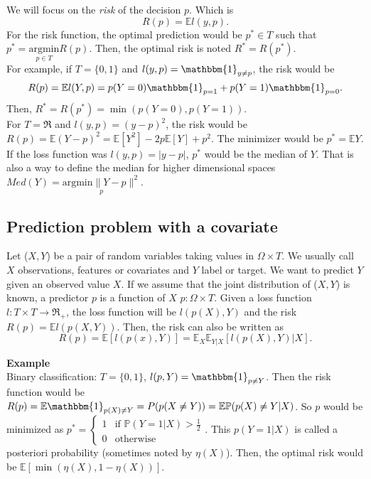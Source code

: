 \documentclass[11pt, english]{article}
\begin{document}
We will focus on the \textit{risk} of the decision $p$. Which is
\begin{equation}
	R(p)=\mathbb{E}l(y,p).
\end{equation}
For the risk function, the optimal prediction would be $p^*\in T$ such that $p^*=\underset{p\in T}{\text{argmin}}R(p)$. Then, the optimal risk is noted $R^*=R(p^*)$.\\

For example, if $ T=\{0,1\}$ and $l(y,p)=\mathbbm{1}_{y\neq p}$, the risk would be 
\begin{equation}
	R(p)=\mathbb{E}l(Y,p)=p(Y=0)\mathbbm{1}_{p=1}+p(Y=1)\mathbbm{1}_{p=0}.
\end{equation}
Then, $R^*=R(p^*)=\min(p(Y=0),p(Y=1))$.\\

For $ T=\Re$ and $l(y,p)=(y-p)^2$, the risk would be $R(p)=\mathbb{E}(Y-p)^2=\mathbb{E}[Y^2]-2p\mathbb{E}[Y]+p^2$. The minimizer would be $p^*=\mathbb{E}Y$. If the loss function was $l(y,p)=|y-p|$, $p^*$ would be the median of $Y$. That is also a way to define the median for higher dimensional spaces $Med(Y)=\underset{p}{\text{argmin}\|Y-p\|^2}$.

\subsection{Prediction problem with a covariate}

Let ($X,Y$) be a pair of random variables taking values in $\Omega\times T$. We usually call $X$ observations, features or covariates and $Y$ label or target. We want to predict $Y$ given an observed value $X$. If we assume that the joint distribution of ($X,Y$) is known, a predictor $p$ is a function of $X$ $p:\Omega\times T$. Given a loss function $l:T\times T\rightarrow \Re_{+}$, the loss function will be $l(p(X),Y)$ and the risk $R(p)=\mathbb{E}l(p(X,Y))$. Then, the risk can also be written as 
\begin{equation}
	R(p)=\mathbb{E}[l(p(x),Y)]=\mathbb{E}_X\mathbb{E}_{Y|X}[l(p(X),Y)|X].
\end{equation}


\textbf{Example\\}
Binary classification: $T=\{0,1\}$, $l(p,Y)=\mathbbm{1}_{p\neq Y}$. Then the risk function would be $R(p)=\mathbb{E}\mathbbm{1}_{p(X)\neq Y}=P(p(X\neq Y))=\mathbb{E}\mathbb{P}(p(X)\neq Y|X)$. So $p$ would be minimized as $p^*=\left\{\begin{array}{ll}
1 & \text{if }\mathbb{P}(Y=1|X)>\frac{1}{2}\\
0 & \text{otherwise}
\end{array}\right.$. This $p(Y=1|X)$ is called a posteriori probability (sometimes noted by $\eta(X)$). Then, the optimal risk would be $\mathbb{E}[\min(\eta(X),1-\eta(X))]$. 
\end{document}

